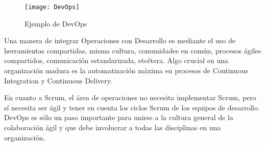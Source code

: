\begin{figure}[h]
  \centering
  \texttt{[image: DevOps]}
  \caption{Ejemplo de DevOps}
  \centering
  \label{fig:DevOps} %
\end{figure}

Una manera de integrar Operaciones con Desarrollo es mediante el uso de herramientas compartidas, misma cultura, comunidades en común, procesos ágiles compartidos, comunicación estandarizada, etcétera. Algo crucial en una organización madura es la automatización máxima en procesos de Continuous Integration y Continuous Delivery.

En cuanto a Scrum, el área de operaciones no necesita implementar Scrum, pero sí necesita ser ágil y tener en cuenta los ciclos Scrum de los equipos de desarrollo. DevOps es sólo un paso importante para unirse a la cultura general de la colaboración ágil y que debe involucrar a todas las disciplinas en una organización. 


